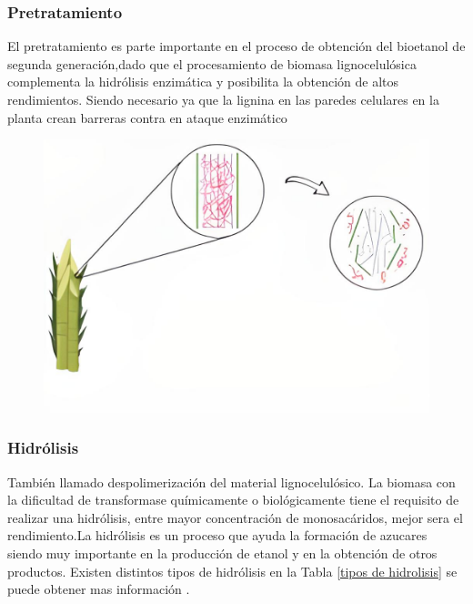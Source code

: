 \documentclass[12pt]{article}
\begin{document}
		\subsubsection{Pretratamiento}
		
		El pretratamiento es parte importante en el proceso de obtención del bioetanol de segunda generación,dado que el procesamiento de biomasa lignocelulósica complementa la hidrólisis enzimática y posibilita la obtención de altos rendimientos. Siendo necesario ya que la lignina en las paredes celulares en la planta crean barreras contra en ataque enzimático %
		\newline 
		
		\begin{figure}[H]
			\centering
			\includegraphics[width=0.4\linewidth]{imagenes/pretrata_1}
			\caption[Efecto del pretratamiento de biomasa ligno- celulósica]{}
			\label{fig:pretrata1}
		\end{figure}
		
		
		\subsubsection{Hidrólisis}
		También llamado despolimerización del material lignocelulósico. La biomasa con la dificultad de transformase químicamente  o biológicamente tiene el requisito de realizar una hidrólisis, entre mayor concentración de monosacáridos, mejor sera el rendimiento.La hidrólisis es un proceso que ayuda la formación de azucares siendo muy importante en la producción de etanol y en la obtención de otros productos. Existen distintos tipos de hidrólisis en la Tabla \ref{tipos de hidrolisis} se puede obtener mas información .
		
\end{document}
